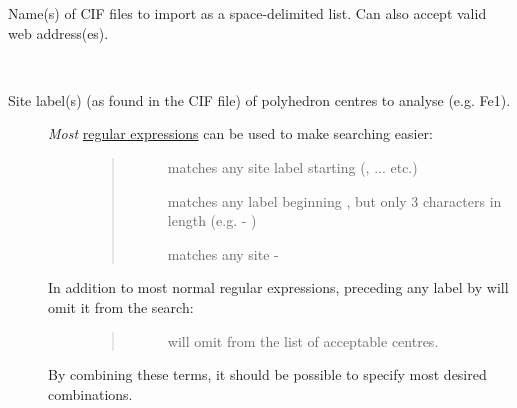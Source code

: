 \documentclass[a4paper,10pt,openany, oneside]{sphinxmanual}
\begin{document}
\begin{fulllineitems}
\label{script_input:cmdoption-CIFellipsoid-arg-cifs}
Name(s) of CIF files to import as a space-delimited list. Can also accept valid web address(es).

\end{fulllineitems}


\begin{fulllineitems}
\label{script_input:cmdoption-CIFellipsoid-m}~\begin{description}
\item[{Site label(s) (as found in the CIF file) of polyhedron centres to analyse (e.g. Fe1).}] \leavevmode\begin{description}
\item[{\emph{Most} \href{https://docs.python.org/2/library/re.html}{regular expressions} can be used to make searching easier:}] \leavevmode\begin{quote}\begin{description}
\item[{}] \leavevmode
matches any site label starting  (,  ...  etc.)

\item[{}] \leavevmode
matches any label beginning , but only 3 characters in length (e.g.  - )

\item[{}] \leavevmode
matches any site  - 

\end{description}\end{quote}

\item[{In addition to most normal regular expressions, preceding any label by \sphinxcode{\#} will omit it from the search:}] \leavevmode\begin{quote}\begin{description}
\item[{}] \leavevmode
will omit  from the list of acceptable centres.

\end{description}\end{quote}

\end{description}

By combining these terms, it should be possible to specify most desired combinations.

\end{description}

\end{fulllineitems}
\end{document}
